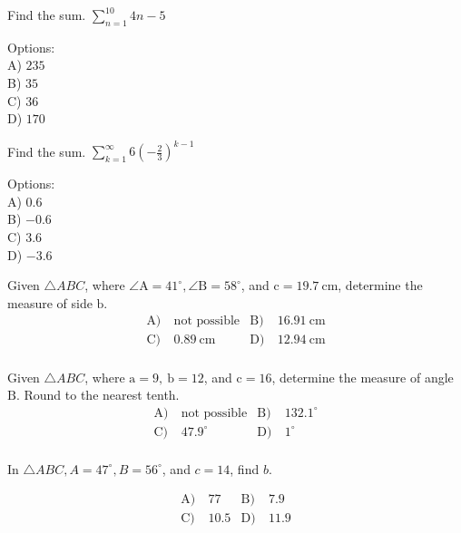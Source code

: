 \begin{problem}\label{AI-Algebra11}
Find the sum. \( \sum_{n=1}^{10} 4n - 5 \)

\noindent Options:\\
A) \( 235 \)\\
B) \( 35 \)\\
C) \( 36 \)\\
D) \( 170 \)
\end{problem}


\begin{problem}\label{AI-Series1}
Find the sum. \( \sum_{k=1}^{\infty} 6 \left(-\frac{2}{3}\right)^{k-1} \)

\noindent Options:\\
A) \( 0.6 \)\\
B) \( -0.6 \)\\
C) \( 3.6 \)\\
D) \( -3.6 \)
\end{problem}


\begin{problem}\label{PreCal-29}
Given $\triangle A B C$, where $\angle \mathrm{A}=41^{\circ}, \angle \mathrm{B}=58^{\circ}$, and $\mathrm{c}=19.7 \mathrm{~cm}$, determine the measure of side $\mathrm{b}$.
\begin{align*}
\text{A)}\ & \text{not possible} &
\text{B)}\ &  16.91 \mathrm{~cm} \\
\text{C)}\ & 0.89 \mathrm{~cm}  &
\text{D)}\ & 12.94 \mathrm{~cm}\\
\end{align*}    
\end{problem}


\begin{problem}\label{PreCal-30}
Given $\triangle A B C$, where $\mathrm{a}=9, \mathrm{~b}=12$, and $\mathrm{c}=16$, determine the measure of angle $\mathrm{B}$. Round to the nearest tenth.
\begin{align*}
\text{A)}\ & \text{not possible} &
\text{B)}\ & 132.1^{\circ} \\
\text{C)}\ & 47.9^{\circ}  &
\text{D)}\ & 1^{\circ}\\
\end{align*}    
\end{problem}


 \begin{problem}\label{PreCal-31}
In $\triangle A B C, A=47^{\circ}, B=56^{\circ}$, and $c=14$, find $b$.

\begin{align*}
\text{A)}\ &  77&
\text{B)}\ & 7.9 \\
\text{C)}\ &   10.5&
\text{D)}\ & 11.9\\
\end{align*}    
\end{problem}


